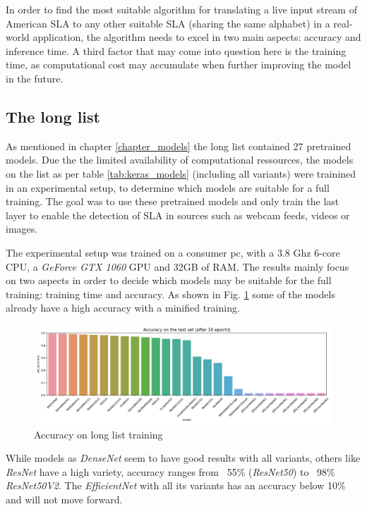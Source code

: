 In order to find the most suitable algorithm for translating a live input stream of American SLA to any other suitable SLA (sharing the same alphabet) in a real-world application, the algorithm needs to excel in two main aspects: accuracy and inference time. A third factor that may come into question here is the training time, as computational cost may accumulate when further improving the model in the future.

\subsection{The long list}\label{chapter_long}
As mentioned in chapter \ref{chapter_models} the long list contained 27 pretrained models. Due the the limited availability of computational ressources, the models on the list as per table \ref{tab:keras_models} (including all variants) were trainined in an experimental setup, to determine which models are suitable for a full training. The goal was to use these pretrained models and only train the last layer to enable the detection of SLA in sources such as webcam feeds, videos or images.

The experimental setup was trained on a consumer pc, with a 3.8 Ghz 6-core CPU, a \textit{GeForce GTX 1060} GPU and 32GB of RAM. The results mainly focus on two aspects in order to decide which models may be suitable for the full training: training time and accuracy. As shown in Fig. \ref{fig:long_list_acc} some of the models already have a high accuracy with a minified training.

\begin{figure}[h]
    \centering
    \caption{Accuracy on long list training}
	\label{fig:long_list_acc}
    \includegraphics[width=\linewidth]{figures/long_val_accuracy.png}
\end{figure}

While models as \textit{DenseNet} seem to have good results with all variants, others like \textit{ResNet} have a high variety, accuracy ranges from ~55\% (\textit{ResNet50}) to ~98\% \textit{ResNet50V2}. The \textit{EfficientNet} with all its variants has an accuracy below 10\% and will not move forward.

